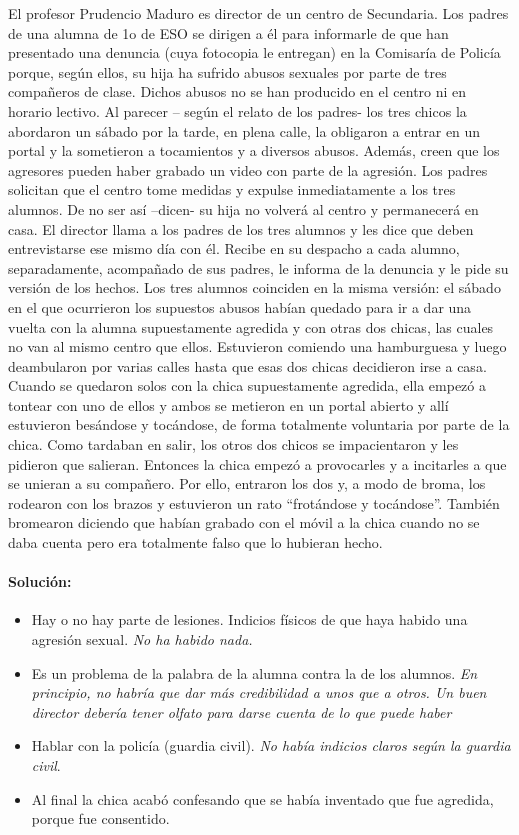 {El profesor Prudencio Maduro es director de un centro de Secundaria.
%
Los padres de una alumna de 1o de ESO se dirigen a él para informarle de que han presentado una denuncia (cuya fotocopia le entregan) en la Comisaría de Policía porque, según ellos, su hija ha sufrido abusos sexuales por parte de tres compañeros de clase.
%
Dichos abusos no se han producido en el centro ni en horario lectivo.
%
Al parecer – según el relato de los padres- los tres chicos la abordaron un sábado por la tarde, en plena calle, la obligaron a entrar en un portal y la sometieron a tocamientos y a diversos abusos.
%
Además, creen que los agresores pueden haber grabado un video con parte de la agresión.
%
Los padres solicitan que el centro tome medidas y expulse inmediatamente a los tres alumnos.
%
De no ser así –dicen- su hija no volverá al centro y permanecerá en casa.
%
El director llama a los padres de los tres alumnos y les dice que deben entrevistarse ese mismo día con él.
%
Recibe en su despacho a cada alumno, separadamente, acompañado de sus padres, le informa de la denuncia y le pide su versión de los hechos.
%
Los tres alumnos coinciden en la misma versión: el sábado en el que ocurrieron los supuestos abusos habían quedado para ir a dar una vuelta con la alumna supuestamente agredida y con otras dos chicas, las cuales no van al mismo centro que ellos.
%
Estuvieron comiendo una hamburguesa y luego deambularon por varias calles hasta que esas dos chicas decidieron irse a casa.
%
Cuando se quedaron solos con la chica supuestamente agredida, ella empezó a tontear con uno de ellos y ambos se metieron en un portal abierto y allí estuvieron besándose y tocándose, de forma totalmente voluntaria por parte de la chica.
%
Como tardaban en salir, los otros dos chicos se impacientaron y les pidieron que salieran.
%
Entonces la chica empezó a provocarles y a incitarles a que se unieran a su compañero.
%
Por ello, entraron los dos y, a modo de broma, los rodearon con los brazos y estuvieron un rato “frotándose y tocándose”.
%
También bromearon diciendo que habían grabado con el móvil a la chica cuando no se daba cuenta pero era totalmente falso que lo hubieran hecho.

\paragraph{Solución:}

\begin{itemize}
	\item Hay o no hay parte de lesiones. Indicios físicos de que haya habido una agresión sexual.
	\subitem\textit{No ha habido nada.}
	\item Es un problema de la palabra de la alumna contra la de los alumnos.
	\subitem\textit{En principio, no habría que dar más credibilidad a unos que a otros. 
	Un buen director debería tener olfato para darse cuenta de lo que puede haber}
	\item Hablar con la policía (guardia civil). 
	\subitem\textit{No había indicios claros según la guardia civil}.
	\item Al final la chica acabó confesando que se había inventado que fue agredida, porque fue consentido.
\end{itemize}

}
